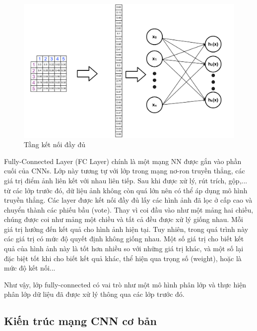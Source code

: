 \begin{center}
    \begin{figure}[h!]
    \begin{center}
     \includegraphics[scale=0.25]{img/Fully-Connected_Layer.png}
    \end{center}
    \caption{Tầng kết nối đầy đủ \cite{fullconnect} }
    \label{refhinh7}
    \end{figure}
\end{center}

Fully-Connected Layer (FC Layer) chính là một mạng NN được gắn vào phần cuối của CNNs. Lớp này tương tự với lớp trong mạng nơ-ron truyền thẳng, các giá trị điểm ảnh liên kết với nhau liên tiếp. Sau khi được xử lý, rút trích, gộp,... từ các lớp trước đó, dữ liệu ảnh không còn quá lớn nên có thể áp dụng mô hình truyền thẳng. Các layer được kết nối đầy đủ lấy các hình ảnh đã lọc ở cấp cao và chuyển thành các phiếu bầu (vote). Thay vì coi đầu vào như một mảng hai chiều, chúng được coi như mảng một chiều và tất cả đều được xử lý giống nhau. Mỗi giá trị hướng đến kết quả cho hình ảnh hiện tại. Tuy nhiên, trong quá trình này các giá trị có mức độ quyết định không giống nhau. Một số giá trị cho biết kết quả của hình ảnh này là tốt hơn nhiều so với những giá trị khác, và một số lại đặc biệt tốt khi cho biết kết quả khác, thể hiện qua trọng số (weight), hoặc là mức độ kết nối...

Như vậy, lớp fully-connected có vai trò như một mô hình phân lớp và thực hiện phân lớp dữ liệu đã được xử lý thông qua các lớp trước đó.

\subsection{Kiến trúc mạng CNN cơ bản}

